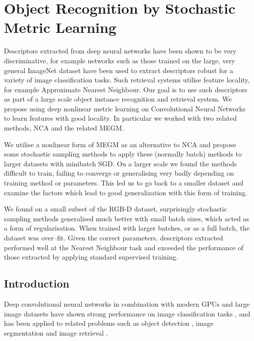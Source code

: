 
\chapter{Object Recognition by Stochastic Metric Learning}
\label{chap:metric} 



Descriptors extracted from deep neural networks have been shown to be very discriminative,
for example networks such as those trained on the large, very general ImageNet dataset have been used to extract descriptors robust for a variety of image classification tasks. Such retrieval systems utilise feature locality, for example Approximate Nearest Neighbour. Our goal is to use such descriptors as part of a large scale object instance recognition and retrieval system. We propose using deep nonlinear metric learning on Convolutional Neural Networks to learn features with good locality. In particular we worked with two related methods, \gls{NCA} and the related \gls{MEGM}.

We utilise a nonlinear form of \gls{MEGM} as an alternative to \gls{NCA} and propose some stochastic sampling methods to apply these (normally batch) methods to larger datasets with minibatch \gls{SGD}. On a larger scale we found the methods difficult to train, failing to converge or generalising very badly depending on training method or parameters. This led us to go back to a smaller dataset and examine the factors which lead to good generalization with this form of training.
  
We found on a small subset of the RGB-D dataset, surprisingly stochastic sampling methods generalised much better with small batch sizes, which acted as a form of regularisation. When trained with larger batches, or as a full batch, the dataset was over--fit. Given the correct parameters, descriptors extracted performed well at the Nearest Neighbour task and exceeded the performance of those extracted by applying standard supervised training.





\section{Introduction}

Deep convolutional neural networks in combination with modern \gls{GPU}s and large image datasets have shown strong performance on image classification tasks \cite {Krizhevsky2012}, and has been applied to related problems such as object detection \cite{Sermanet2013}, image segmentation \cite{Masci2013} and image retrieval \cite{Razavian2014}.

